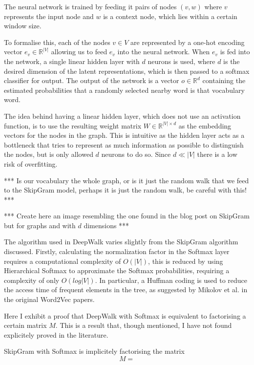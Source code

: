 \documentclass[a4paper]{article}
\begin{document}
The neural network is trained by feeding it pairs of nodes $(v, w)$ where $v$
represents the input node and $w$ is a context node, which lies within a certain
window size.

To formalise this, each of the nodes $v \in V$ are represented by a one-hot
encoding vector $e_v \in \mathbb{R}^{|V|}$ allowing us to feed $e_v$ into the
neural network. When $e_v$ is fed into the network, a single linear hidden layer with
$d$ neurons is used, where $d$ is the desired dimension of the latent
representations, which is then passed to a softmax classifier for output. The
output of the network is a vector $o \in \mathbb{R}^d$ containing the estimated
probabilities that a randomly selected nearby word is that vocabulary word.

The idea behind having a linear hidden layer, which does not use an activation
function, is to use the resulting weight matrix $W \in \mathbb{R}^{|V| \times
  d}$ as the embedding vectors for the nodes in the graph. This is intuitive as
the hidden layer acts as a bottleneck that tries to represent as much
information as possible to distinguish the nodes, but is only allowed $d$
neurons to do so. Since $d \ll |V|$ there is a low risk of overfitting.

*** Is our vocabulary the whole graph, or is it just the random walk that we
feed to the SkipGram model, perhaps it is just the random walk, be careful with
this! ***

*** Create here an image resembling the one found in the blog post on SkipGram
but for graphs and with $d$ dimensions ***

The algorithm used in DeepWalk varies slightly from the SkipGram algorithm
discussed. Firstly, calculating the normalization factor
in the Softmax layer requires a computational complexity of $O(|V|)$, this is
reduced by using Hierarchical Softmax to approximate the Softmax probabilities,
requiring a complexity of only $O(log|V|)$. In particular, a Huffman coding is
used to reduce the access time of frequent elements in the tree, as suggested by
Mikolov et al. in the original Word2Vec
papers.\cite{mikolov2013distributed,mikolov2013efficient}

Here I exhibit a proof that DeepWalk with Softmax is equivalent to factorising a
certain matrix $M$. This is a result that, though mentioned, I have not found
explicitely proved in the literature.

\begin{theorem}
  SkipGram with Softmax is implicitely factorising the matrix
  \[M = \]
\end{theorem}
\end{document}
